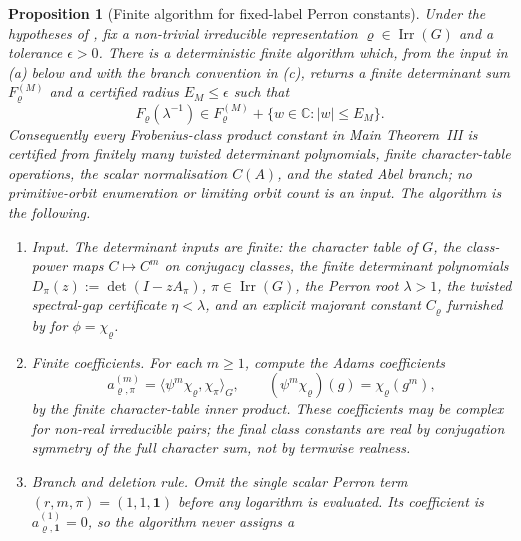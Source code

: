 \documentclass[11pt,a4paper]{amsart}
\theoremstyle{plain}
\newtheorem{proposition}[theorem]{Proposition}
\theoremstyle{definition}
\theoremstyle{remark}
\DeclareMathOperator{\Irr}{Irr}
\newcommand{\CC}{\mathbb{C}}
\begin{document}
\begin{proposition}[Finite algorithm for fixed-label Perron constants]
  \label{prop:fixed-label-perron-finite-algorithm}
  Under the hypotheses of , fix a
  non-trivial irreducible representation \(\varrho\in\Irr(G)\) and a tolerance
  \(\epsilon>0\).  There is a deterministic finite algorithm which, from the
  input in \textup{(a)} below and with the branch convention in
  \textup{(c)}, returns a finite determinant sum
  \(F_\varrho^{(M)}\) and a certified radius \(E_M\le\epsilon\) such that
  \[
    F_\varrho(\lambda^{-1})
    \in F_\varrho^{(M)}+\{w\in\CC:|w|\le E_M\}.
  \]
  Consequently every Frobenius-class product constant in Main Theorem~III is
  certified from finitely many twisted determinant polynomials, finite
  character-table operations, the scalar normalisation \(C(A)\), and the stated
  Abel branch; no primitive-orbit enumeration or limiting orbit count is an
  input.  The algorithm is the following.
  \begin{enumerate}[label=\textup{(\alph*)},leftmargin=*]
    \item \emph{Input.}  The determinant inputs are finite: the character table of \(G\),
      the class-power maps \(C\mapsto C^m\) on conjugacy classes, the finite
      determinant polynomials \(D_\pi(z):=\det(I-zA_\pi)\),
      \(\pi\in\Irr(G)\), the Perron root \(\lambda>1\), the twisted
      spectral-gap certificate \(\eta<\lambda\), and an explicit majorant
      constant \(C_\varrho\) furnished by
       for
      \(\phi=\chi_\varrho\).
    \item \emph{Finite coefficients.}  For each \(m\ge1\), compute the Adams coefficients
      \begin{equation}\label{eq:fixed-label-algorithm-adams-coefficients}
        a_{\varrho,\pi}^{(m)}
        =\bigl\langle \psi^m\chi_\varrho,\chi_\pi\bigr\rangle_G,
        \qquad
        (\psi^m\chi_\varrho)(g)=\chi_\varrho(g^m),
      \end{equation}
      by the finite character-table inner product.  These coefficients may be
      complex for non-real irreducible pairs; the final class constants are
      real by conjugation symmetry of the full character sum, not by termwise
      realness.
    \item \emph{Branch and deletion rule.}  Omit the single scalar Perron term
      \((r,m,\pi)=(1,1,\mathbf1)\) before any logarithm is evaluated.  Its
      coefficient is
      \(a_{\varrho,\mathbf1}^{(1)}=0\), so the algorithm never assigns a

\end{enumerate}
\end{proposition}
\end{document}
